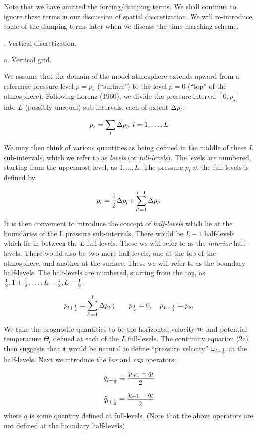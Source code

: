 Note that we have omitted the forcing/damping terms. We shall continue to
ignore these terms in our discussion of spatial discretization. We will
re-introduce some of the damping terms later when we discuss the time-marching
scheme.
 
. Vertical discretization.
 
\Subsection a. Vertical grid.
 
We assume that the domain of the model atmosphere extends upward from a
reference pressure level $p=p_s$ (``surface'') to the level $p=0$ (``top'' of
the atmosphere). Following Lorenz (1960), we divide the pressure-interval
$[0,p_s]$ into $L$ (possibly unequal) sub-intervals, each of extent ${\Delta p}_l$.
 
$$p_s = \sum_l {\Delta p}_l, \; l= 1, \ldots, L
$$
 
We may then think of various quantities as being defined in the middle of
these $L$ sub-intervals, which we refer to as {\it levels} (or {\it
full-levels}). The levels are numbered, starting from the
uppermost-level, as $1, \ldots, L$.  The pressure $p_l$ at the full-levels is
defined by
 
$$ p_l = {1\over2}{\Delta p}_l + \sum_{l'=1}^{l-1} {\Delta p}_{l'}
$$
 
It is then convenient to introduce the concept of {\it half-levels} which lie
at the boundaries of the L pressure sub-intervals. There would be $L-1$
half-levels which lie in between the $L$ full-levels. These we will refer to
as the {\it interior} half-levels. There would also be two more half-levels,
one at the top of the atmosphere, and another at the surface. These we will
refer to as the boundary half-levels. The half-levels are numbered, starting
from the top, as ${1 \over 2}, 1+{1 \over 2}, \ldots, L-{1 \over 2}, L+{1 \over 2}$.
 
$$ p_{l+{1 \over 2}} = \sum_{l'=1}^l {\Delta p}_{l'};\qquad p_{1 \over 2}=0,\quad p_{L+{1 \over 2}}=p_s.
$$
 
We take the prognostic quantities to be the horizontal velocity ${{\bf u}}_l$ and
potential temperature $\Theta_l$ defined at each of the $L$ full-levels.  The
continuity equation (2c) then suggests that it would be natural to define
``pressure velocity'' $\omega_{l+{1 \over 2}}$ at the half-levels.  Next we
introduce the {\it bar} and {\it cap} operators:
 
$$ {\overline q}_{l+{1 \over 2}} \equiv { q_{l+1} + q_l \over 2}
$$
 
$$ {\widehat  q}_{l+{1 \over 2}} \equiv { q_{l+1} - q_l \over 2}
$$
where $q$ is some quantity defined at full-levels.
(Note that the above operators are not defined at the boundary half-levels)
 
